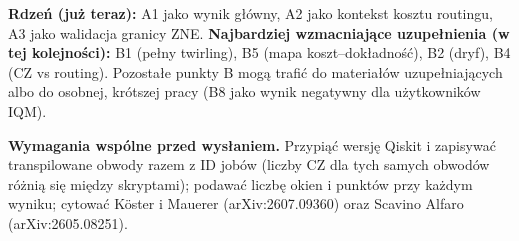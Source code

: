 \documentclass[11pt,a4paper]{article}
\begin{document}
\textbf{Rdzeń (już teraz):} A1 jako wynik główny, A2 jako kontekst kosztu routingu, A3 jako
walidacja granicy ZNE. \textbf{Najbardziej wzmacniające uzupełnienia (w tej kolejności):}
B1 (pełny twirling), B5 (mapa koszt--dokładność), B2 (dryf), B4 (CZ vs routing).
Pozostałe punkty B mogą trafić do materiałów uzupełniających albo do osobnej, krótszej pracy
(B8 jako wynik negatywny dla użytkowników IQM).

\textbf{Wymagania wspólne przed wysłaniem.} Przypiąć wersję Qiskit i zapisywać transpilowane
obwody razem z ID jobów (liczby CZ dla tych samych obwodów różnią się między skryptami);
podawać liczbę okien i punktów przy każdym wyniku; cytować Köster i Mauerer
(arXiv:2607.09360) oraz Scavino Alfaro (arXiv:2605.08251).
\end{document}
